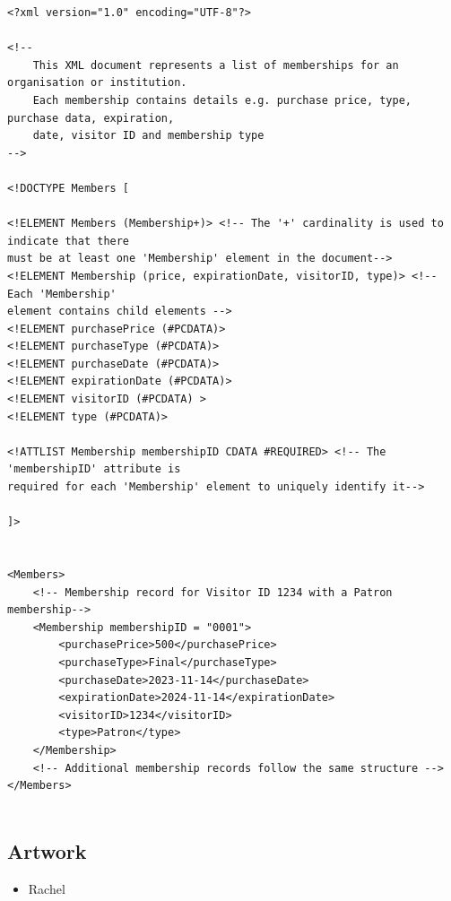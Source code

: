 \documentclass{article} %
\begin{document}
\begin{verbatim}
<?xml version="1.0" encoding="UTF-8"?>

<!-- 
    This XML document represents a list of memberships for an organisation or institution. 
    Each membership contains details e.g. purchase price, type, purchase data, expiration, 
    date, visitor ID and membership type
-->

<!DOCTYPE Members [

<!ELEMENT Members (Membership+)> <!-- The '+' cardinality is used to indicate that there 
must be at least one 'Membership' element in the document-->
<!ELEMENT Membership (price, expirationDate, visitorID, type)> <!-- Each 'Membership' 
element contains child elements -->
<!ELEMENT purchasePrice (#PCDATA)>
<!ELEMENT purchaseType (#PCDATA)>
<!ELEMENT purchaseDate (#PCDATA)>
<!ELEMENT expirationDate (#PCDATA)>
<!ELEMENT visitorID (#PCDATA) >
<!ELEMENT type (#PCDATA)>

<!ATTLIST Membership membershipID CDATA #REQUIRED> <!-- The 'membershipID' attribute is 
required for each 'Membership' element to uniquely identify it-->

]>


<Members>
    <!-- Membership record for Visitor ID 1234 with a Patron membership-->
    <Membership membershipID = "0001">
        <purchasePrice>500</purchasePrice>
        <purchaseType>Final</purchaseType>
        <purchaseDate>2023-11-14</purchaseDate>
        <expirationDate>2024-11-14</expirationDate>
        <visitorID>1234</visitorID>
        <type>Patron</type>
    </Membership>
    <!-- Additional membership records follow the same structure -->
</Members>
    
\end{verbatim}

\subsection{Artwork}

\begin{itemize}
    \item Rachel
\end{itemize}
\end{document}
